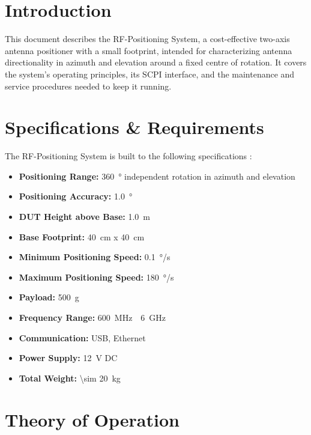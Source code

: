 \newpage

\section{Introduction}

This document describes the RF-Positioning System, a cost-effective two-axis antenna positioner with a small footprint, intended for characterizing antenna directionality in azimuth and elevation around a fixed centre of rotation. It covers the system's operating principles, its SCPI interface, and the maintenance and service procedures needed to keep it running.

\section{Specifications \& Requirements}

The RF-Positioning System is built to the following specifications \cite{timothy_foley_low-cost_2017, maturo_gmbh_ota_nodate, innco_systems_gmbh_de3600_nodate, microwave_vision_group_light_2025, ets-lindgren_2117_nodate, tdk_rf_solutions_3-dimensional_2024}:
\begin{itemize}
    \item \textbf{Positioning Range:} \SI{360}{\degree} independent rotation in azimuth and elevation
    \item \textbf{Positioning Accuracy:} \SI{1.0}{\degree}
    \item \textbf{DUT Height above Base:} \SI{1.0}{\meter}
    \item \textbf{Base Footprint:} \SI{40}{\centi\meter} x \SI{40}{\centi\meter}
    \item \textbf{Minimum Positioning Speed:} \SI{0.1}{\degree/\second}
    \item \textbf{Maximum Positioning Speed:} \SI{180}{\degree/\second}
    \item \textbf{Payload:} \SI{500}{\gram} 
    \item \textbf{Frequency Range:} \SI{600}{\mega\hertz}~\textendash~\SI{6}{\giga\hertz} 
    \item \textbf{Communication:} USB, Ethernet
    \item \textbf{Power Supply:} \SI{12}{\volt} DC
    \item \textbf{Total Weight:} \SI{\sim 20}{\kilo\gram}
\end{itemize}

\section{Theory of Operation}



